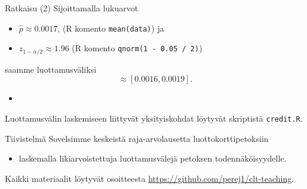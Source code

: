 \documentclass{beamer}
\begin{document}

\begin{frame}{Ratkaisu (2)}
  Sijoittamalla lukuarvot
  \begin{itemize}
    \item $\hat p\approx 0.0017$, (\textsf{R} komento \texttt{mean(data)}) ja
    \item $z_{1 - \alpha / 2} \approx 1.96$ (\textsf{R} komento \texttt{qnorm(1
    - 0.05 / 2)})
  \end{itemize}
  saamme luottamusväliksi
  \begin{equation*}
    \approx \left[0.0016, 0.0019\right].
  \end{equation*}
  \pause
  \begin{itemize}
    \item[]
  \end{itemize}
  Luottamusvälin laskemiseen liittyvät yksityiskohdat löytyvät skriptistä
  \texttt{credit.R}. 
\end{frame}

\begin{frame}{Tiivistelmä}
  Sovelsimme keskeistä raja-arvolausetta luottokorttipetoksiin
  \pause
  \begin{itemize}
    \item laskemalla likiarvoistettuja luottamusvälejä petoksen
    todennäköisyydelle.
  \end{itemize}
  \pause
  Kaikki materiaalit löytyvät osoitteesta
  \url{https://github.com/perej1/clt-teaching}.
\end{frame}
\end{document}
